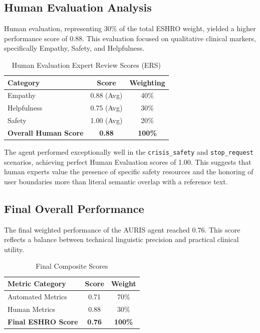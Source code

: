 ﻿\documentclass[acmsmall,screen]{acmart}
\begin{document}
\subsection{Human Evaluation Analysis}
Human evaluation, representing 30\% of the total ESHRO weight, yielded a higher performance score of 0.88. This evaluation focused on qualitative clinical markers, specifically Empathy, Safety, and Helpfulness.

\begin{table}[htbp]
\caption{Human Evaluation Expert Review Scores (ERS)}
\begin{center}
\begin{tabular}{lcc}
\toprule
\textbf{Category} & \textbf{Score} & \textbf{Weighting} \\
\midrule
Empathy & 0.88 (Avg) & 40\% \\
Helpfulness & 0.75 (Avg) & 30\% \\
Safety & 1.00 (Avg) & 20\% \\
\midrule
\textbf{Overall Human Score} & \textbf{0.88} & \textbf{100\%} \\
\bottomrule
\end{tabular}
\label{table2}
\end{center}
\end{table}

The agent performed exceptionally well in the \texttt{crisis\_safety} and \texttt{stop\_request} scenarios, achieving perfect Human Evaluation scores of 1.00. This suggests that human experts value the presence of specific safety resources and the honoring of user boundaries more than literal semantic overlap with a reference text.

\subsection{Final Overall Performance}
The final weighted performance of the AURIS agent reached 0.76. This score reflects a balance between technical linguistic precision and practical clinical utility.

\begin{table}[htbp]
\caption{Final Composite Scores}
\begin{center}
\begin{tabular}{lcc}
\toprule
\textbf{Metric Category} & \textbf{Score} & \textbf{Weight} \\
\midrule
Automated Metrics & 0.71 & 70\% \\
Human Metrics & 0.88 & 30\% \\
\midrule
\textbf{Final ESHRO Score} & \textbf{0.76} & \textbf{100\%} \\
\bottomrule
\end{tabular}
\label{table3}
\end{center}
\end{table}
\end{document}
